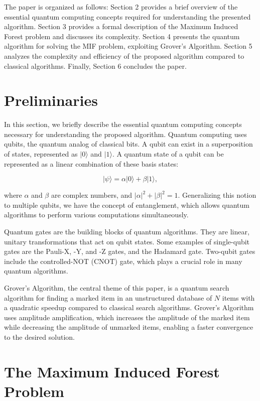 The paper is organized as follows: Section 2 provides a brief overview of the essential quantum computing concepts required for understanding the presented algorithm. Section 3 provides a formal description of the Maximum Induced Forest problem and discusses its complexity. Section 4 presents the quantum algorithm for solving the MIF problem, exploiting Grover's Algorithm. Section 5 analyzes the complexity and efficiency of the proposed algorithm compared to classical algorithms. Finally, Section 6 concludes the paper.

\section{Preliminaries}

In this section, we briefly describe the essential quantum computing concepts necessary for understanding the proposed algorithm. Quantum computing uses qubits, the quantum analog of classical bits. A qubit can exist in a superposition of states, represented as $|0\rangle$ and $|1\rangle$. A quantum state of a qubit can be represented as a linear combination of these basis states:

\begin{equation}
|\psi\rangle = \alpha |0\rangle + \beta |1\rangle,
\end{equation}

where $\alpha$ and $\beta$ are complex numbers, and $|\alpha|^2 + |\beta|^2 = 1$. Generalizing this notion to multiple qubits, we have the concept of entanglement, which allows quantum algorithms to perform various computations simultaneously.

Quantum gates are the building blocks of quantum algorithms. They are linear, unitary transformations that act on qubit states. Some examples of single-qubit gates are the Pauli-X, -Y, and -Z gates, and the Hadamard gate. Two-qubit gates include the controlled-NOT (CNOT) gate, which plays a crucial role in many quantum algorithms.

Grover's Algorithm, the central theme of this paper, is a quantum search algorithm for finding a marked item in an unstructured database of $N$ items with a quadratic speedup compared to classical search algorithms. Grover's Algorithm uses amplitude amplification, which increases the amplitude of the marked item while decreasing the amplitude of unmarked items, enabling a faster convergence to the desired solution.

\section{The Maximum Induced Forest Problem}

